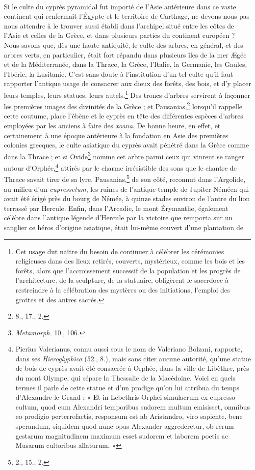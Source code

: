 \documentclass{article}
\begin{document}
\paragraph{}
Si le culte du cyprès pyramidal fut importé de l'Asie antérieure dans ce vaste continent qui renfermait l'Égypte et le territoire de Carthage, ne devons-nous pas nous attendre à le trouver aussi établi dans l'archipel situé entre les côtes de l'Asie et celles de la Grèce, et dans plusieurs parties du continent européen ? Nous savons que, dès une haute antiquité, le culte des arbres, en général, et des arbres verts, en particulier, était fort répandu dans plusieurs îles de la mer Ægée et de la Méditerranée, dans la Thrace, la Grèce, l'Italie, la Germanie, les Gaules, l'Ibérie, la Lusitanie. C'est sans doute à l'institution d'un tel culte qu'il faut rapporter l'antique usage de consacrer aux dieux des forêts, des bois, et d'y placer leurs temples, leurs statues, leurs autels.\footnote{Cet usage dut naître du besoin de continuer à célébrer les cérémonies religieuses dans des lieux retirés, couverts, mystérieux, comme les bois et les forêts, alors que l'accroissement successif de la population et les progrès de l'architecture, de la sculpture, de la statuaire, obligèrent le sacerdoce à restreindre à la célébration des mystères ou des initiations, l'emploi des grottes et des antres sacrés.} Des troncs d'arbres servirent à façonner les premières images des divinités de la Grèce ; et Pausanias,\footnote{8., 17., 2.} lorsqu'il rappelle cette coutume, place l'ébène et le cyprès en tête des différentes espèces d'arbres employées par les anciens à faire des \emph{xoana}. De bonne heure, en effet, et certainement à une époque antérieure à la fondation en Asie des premières colonies grecques, le culte asiatique du cyprès avait pénétré dans la Grèce comme dans la Thrace ; et si Ovide\footnote{\emph{Metamorph.} 10., 106.} nomme cet arbre parmi ceux qui vinrent se ranger autour d'Orphée,\footnote{Pierius Valerianus, connu aussi sous le nom de Valeriano Bolzani, rapporte, dans ses \emph{Hieroglyphica} (52., 8.), mais sans citer aucune autorité, qu'une statue de bois de cyprès avait été consacrée à Orphée, dans la ville de Libèthre, près du mont Olympe, qui sépare la Thessalie de la Macédoine. Voici en quels termes il parle de cette statue et d'un prodige qu'on lui attribua du temps d'Alexandre le Grand : « Et in Lebethris Orphei simulacrum ex cupresso cultum, quod cum Alexandri temporibus sudorem multum emisisset, omnibus eo prodigio perterrefactis, responsum est ab Aristandro, viro sapiente, bene sperandum, siquidem quod nunc opus Alexander aggrederetur, ob rerum gestarum magnitudinem maximum esset sudorem et laborem poetis ac Musarum cultoribus allaturum. »} attirés par le charme irrésistible des sons que le chantre de Thrace savait tirer de sa lyre, Pausanias,\footnote{2., 15., 2.} de son côté, reconnut dans l'Argolide, au milieu d'un \emph{cupressetum}, les ruines de l'antique temple de Jupiter Néméen qui avait été érigé près du bourg de Némée, à quinze stades environ de l'antre du lion terrassé par Hercule. Enfin, dans l'Arcadie, le mont Érymanthe, également célèbre dans l'antique légende d'Hercule par la victoire que remporta sur un sanglier ce héros d'origine asiatique, était lui-même couvert d'une plantation de 
\end{document}
